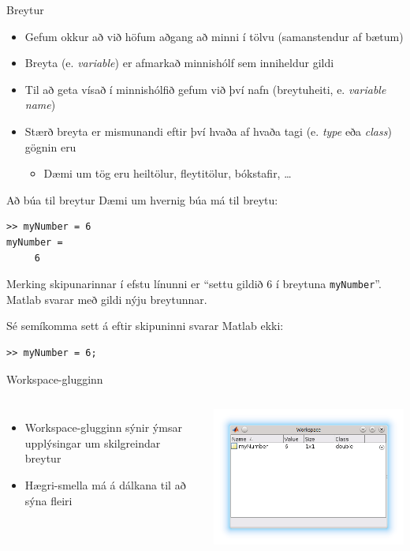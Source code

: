 \documentclass[handout]{beamer}
\begin{document}
\begin{frame}{Breytur}
\begin{itemize}
 \item Gefum okkur að við höfum aðgang að minni í tölvu (samanstendur af bætum)
 \item Breyta (e. \emph{variable}) er afmarkað minnishólf sem inniheldur gildi
 \item Til að geta vísað í minnishólfið gefum við því nafn (breytuheiti, e. \emph{variable name})
 \item Stærð breyta er mismunandi eftir því hvaða af hvaða tagi (e. \emph{type} eða \emph{class}) gögnin eru
 \begin{itemize}
  \item Dæmi um tög eru heiltölur, fleytitölur, bókstafir, \ldots
 \end{itemize}
\end{itemize}
\end{frame}

\begin{frame}[fragile]{Að búa til breytur}
Dæmi um hvernig búa má til breytu:
\begin{verbatim}
>> myNumber = 6
myNumber =  
     6
\end{verbatim}
Merking skipunarinnar í efstu línunni er ``settu gildið $6$ í breytuna \texttt{myNumber}''. Matlab svarar með gildi nýju breytunnar.

Sé semíkomma sett á eftir skipuninni svarar Matlab ekki:
\begin{verbatim}
>> myNumber = 6;
\end{verbatim}
\end{frame}

\begin{frame}{Workspace-glugginn}
\begin{columns}
\begin{itemize}
 \item Workspace-glugginn sýnir ýmsar upplýsingar um skilgreindar breytur
 \item Hægri-smella má á dálkana til að sýna fleiri
\end{itemize}
\includegraphics[width=\linewidth]{Pics/workspace-window}
\end{columns}
\end{frame}
\end{document}
